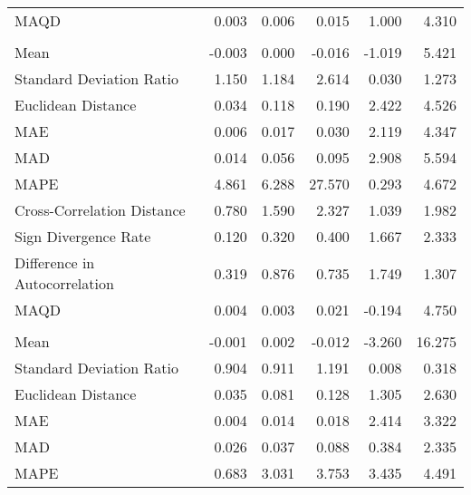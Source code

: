 \begin{landscape}
\begin{ThreePartTable}
\begin{longtable}[t]{lrrrrr}
\hspace{1em}MAQD & 0.003 & 0.006 & 0.015 & 1.000 & 4.310\\
\addlinespace[0.5em]
\multicolumn{6}{l}{\textbf{LVA}}\\
\hline
\hspace{1em}Mean & -0.003 & 0.000 & -0.016 & -1.019 & 5.421\\
\hspace{1em}Standard Deviation Ratio & 1.150 & 1.184 & 2.614 & 0.030 & 1.273\\
\hspace{1em}Euclidean Distance & 0.034 & 0.118 & 0.190 & 2.422 & 4.526\\
\hspace{1em}MAE & 0.006 & 0.017 & 0.030 & 2.119 & 4.347\\
\hspace{1em}MAD & 0.014 & 0.056 & 0.095 & 2.908 & 5.594\\
\hspace{1em}MAPE & 4.861 & 6.288 & 27.570 & 0.293 & 4.672\\
\hspace{1em}Cross-Correlation Distance & 0.780 & 1.590 & 2.327 & 1.039 & 1.982\\
\hspace{1em}Sign Divergence Rate & 0.120 & 0.320 & 0.400 & 1.667 & 2.333\\
\hspace{1em}Difference in Autocorrelation & 0.319 & 0.876 & 0.735 & 1.749 & 1.307\\
\hspace{1em}MAQD & 0.004 & 0.003 & 0.021 & -0.194 & 4.750\\
\addlinespace[0.5em]
\multicolumn{6}{l}{\textbf{MAR}}\\
\hline
\hspace{1em}Mean & -0.001 & 0.002 & -0.012 & -3.260 & 16.275\\
\hspace{1em}Standard Deviation Ratio & 0.904 & 0.911 & 1.191 & 0.008 & 0.318\\
\hspace{1em}Euclidean Distance & 0.035 & 0.081 & 0.128 & 1.305 & 2.630\\
\hspace{1em}MAE & 0.004 & 0.014 & 0.018 & 2.414 & 3.322\\
\hspace{1em}MAD & 0.026 & 0.037 & 0.088 & 0.384 & 2.335\\
\hspace{1em}MAPE & 0.683 & 3.031 & 3.753 & 3.435 & 4.491\\

\end{longtable}
\end{ThreePartTable}
\end{landscape}

